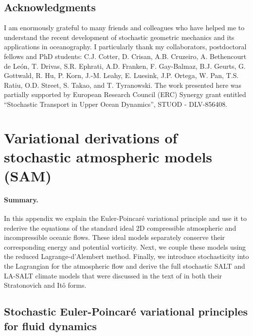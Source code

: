 \documentclass[11pt, oneside]{article}   	%
\numberwithin{equation}{section}
\theoremstyle{plain}
\theoremstyle{definition}
\theoremstyle{remark}
\newcommand{\<}{\langle}
\renewcommand{\>}{\rangle}
\begin{document}
\subsection*{Acknowledgments}

I am enormously grateful to many friends and colleagues who have helped me to understand the recent development of stochastic geometric mechanics and its applications in oceanography. I particularly thank my collaborators, postdoctoral fellows and PhD students: C.J. Cotter, D. Crisan, A.B. Cruzeiro, A. Bethencourt de Le\'on, T. Drivas, S.R. Ephrati, A.D. Franken, F. Gay-Balmaz, B.J. Geurts, G. Gottwald, R. Hu, P. Korn, J.-M. Leahy, E. Luesink, J.P. Ortega, W. Pan, T.S. Ratiu, O.D. Street, S. Takao, and T. Tyranowski. The work presented here was partially supported by European Research Council (ERC) Synergy grant entitled ``Stochastic Transport in Upper Ocean Dynamics'', STUOD - DLV-856408.


\appendix

\section{Variational derivations of stochastic atmospheric models (SAM)} 
\label{sec: SAM1}

\paragraph{Summary.}
In this appendix we explain the Euler-Poincar\'e variational principle and use it to rederive the equations 
of the standard ideal 2D compressible atmospheric and incompressible oceanic flows. 
These ideal models separately conserve their corresponding energy and potential vorticity.
Next, we couple these models using the reduced Lagrange-d'Alembert method. Finally, we introduce stochasticity
 into the Lagrangian for the atmospheric flow and derive the full stochastic SALT and LA-SALT climate models that 
 were discussed in the text of \cite{crisan2023implementation} in both their Stratonovich and It\^o forms.\\

\subsection{Stochastic Euler-Poincar\'e variational principles for fluid dynamics}\label{Section-GeoMech}
\end{document}
